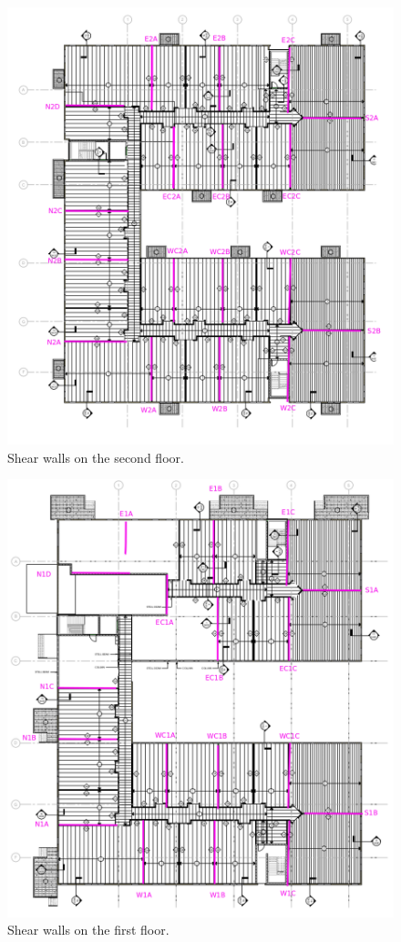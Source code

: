 \begin{figure}
  \begin{center}
  \includegraphics[width=120mm]{figures/2nd_floor_key_plan}
  \end{center}
  \caption{Shear walls on the second floor.}\label{fg_2nd_floor_key_plan}
\end{figure}


\begin{figure}
  \begin{center}
  \includegraphics[width=120mm]{figures/1st_floor_key_plan}
  \end{center}
  \caption{Shear walls on the first floor.}\label{fg_1st_floor_key_plan}
\end{figure}
